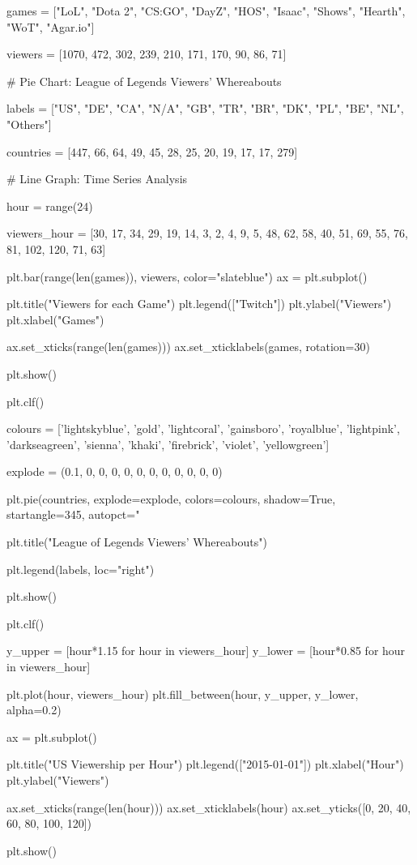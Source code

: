 \documentclass{journal}
\begin{document}
games = ["LoL", "Dota 2", "CS:GO", "DayZ", "HOS", "Isaac", "Shows", "Hearth", "WoT", "Agar.io"]

viewers =  [1070, 472, 302, 239, 210, 171, 170, 90, 86, 71]

# Pie Chart: League of Legends Viewers' Whereabouts

labels = ["US", "DE", "CA", "N/A", "GB", "TR", "BR", "DK", "PL", "BE", "NL", "Others"]

countries = [447, 66, 64, 49, 45, 28, 25, 20, 19, 17, 17, 279]

# Line Graph: Time Series Analysis

hour = range(24)

viewers_hour = [30, 17, 34, 29, 19, 14, 3, 2, 4, 9, 5, 48, 62, 58, 40, 51, 69, 55, 76, 81, 102, 120, 71, 63]

plt.bar(range(len(games)), viewers, color="slateblue")
ax = plt.subplot()

plt.title("Viewers for each Game")
plt.legend(["Twitch"])
plt.ylabel("Viewers")
plt.xlabel("Games")

ax.set_xticks(range(len(games)))
ax.set_xticklabels(games, rotation=30)

plt.show()

plt.clf()

colours = ['lightskyblue', 'gold', 'lightcoral', 'gainsboro', 'royalblue', 'lightpink', 'darkseagreen', 'sienna', 'khaki', 'firebrick', 'violet', 'yellowgreen']

explode = (0.1, 0, 0, 0, 0, 0, 0, 0, 0, 0, 0, 0)

plt.pie(countries, explode=explode, colors=colours, shadow=True, startangle=345, autopct="%

plt.title("League of Legends Viewers' Whereabouts")

plt.legend(labels, loc="right")

plt.show()

plt.clf()

y_upper = [hour*1.15 for hour in viewers_hour]
y_lower = [hour*0.85 for hour in viewers_hour]

plt.plot(hour, viewers_hour)
plt.fill_between(hour, y_upper, y_lower, alpha=0.2)

ax = plt.subplot()

plt.title("US Viewership per Hour")
plt.legend(["2015-01-01"])
plt.xlabel("Hour")
plt.ylabel("Viewers")

ax.set_xticks(range(len(hour)))
ax.set_xticklabels(hour)
ax.set_yticks([0, 20, 40, 60, 80, 100, 120])

plt.show()
\end{document}
